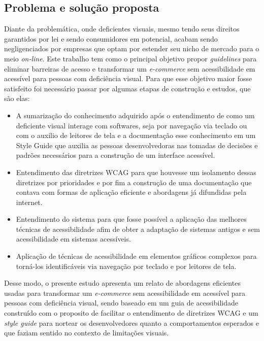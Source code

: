 \subsection{Problema e solução proposta}
{Diante da problemática, onde deficientes visuais, mesmo tendo seus direitos garantidos por lei \cite{brasil2015} e sendo consumidores em potencial, acabam sendo negligenciados por empresas que optam por estender seu nicho de mercado para o  meio \textit{on-line}. Este trabalho tem como o principal objetivo propor \textit{guidelines} para eliminar barreiras de acesso e transformar um \textit{e-commerce} sem acessibilidade em acessível para pessoas com deficiência visual. Para que esse objetivo maior fosse satisfeito foi necessário passar por algumas etapas de construção e estudos, que são elas:   

\begin{itemize}
    \item A sumarização do conhecimento adquirido após o entendimento de como um deficiente visual interage com softwares, seja por navegação via teclado ou com o auxilio de leitores de tela e a documentação esse conhecimento em um Style Guide \cite{STYLE} que auxilia as pessoas desenvolvedoras nas tomadas de decisões e padrões necessários para a construção de um interface acessível. 
    \item Entendimento das diretrizes WCAG \cite{WCAG21} para que houvesse um isolamento dessas diretrizes por prioridades e por fim a construção de uma documentação que contava com formas de aplicação eficiente e abordagens já difundidas pela internet.  
    \item Entendimento do sistema para que fosse possível a aplicação das melhores técnicas de acessibilidade afim de obter a adaptação de sistemas antigos e sem acessibilidade em sistemas acessíveis.  
    \item Aplicação de técnicas de acessibilidade em elementos gráficos complexos para torná-los identificáveis via navegação por teclado e por leitores de tela. 


\end{itemize}
 
 Desse modo, o presente estudo apresenta um relato de abordagens eficientes usadas para transformar um \textit{\textit{e-commerce}} sem acessibilidade em acessível para pessoas com deficiência visual, sendo baseado em um guia de acessibilidade construído com o proposito de facilitar o entendimento de diretrizes WCAG \cite{WCAG21} e um \textit{style guide} \cite{STYLE} para nortear os desenvolvedores quanto a comportamentos esperados e que faziam sentido no contexto de limitações visuais. 
}
